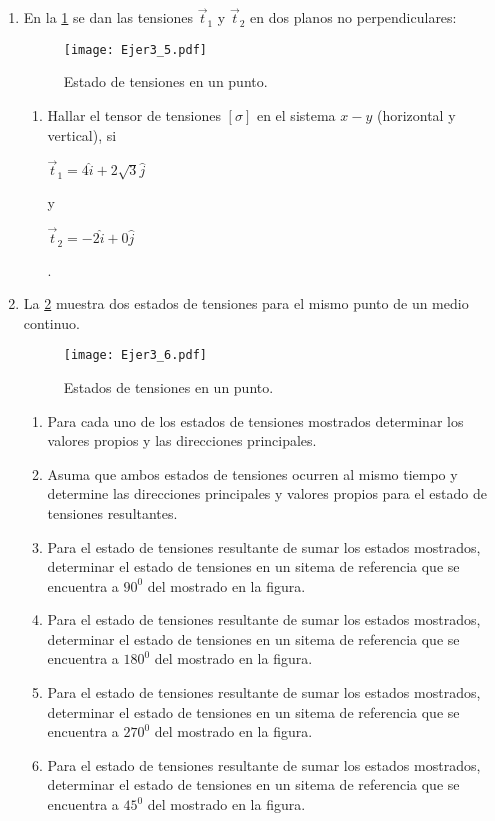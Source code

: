 \documentclass[../notas medios.tex]{subfiles}
\begin{document}
\begin{enumerate}
\item \label{punto05} En la  \cref{cuna:tensiones} se dan las tensiones
$\vec{t}_1$ y $\vec{t}_2$ en dos planos no perpendiculares:\\
%	
\begin{figure}[H]
	\centering
	\texttt{[image: Ejer3\_5.pdf]}
	\caption{Estado de tensiones en un punto.}
	\label{cuna:tensiones}
\end{figure}
\begin{enumerate}
	\item Hallar el tensor de tensiones $[\sigma]$ en el sistema $x-y$ (horizontal y vertical), si \begin{large} $\vec{t}_1= 4 \hat{i} + 2 \sqrt{3} \hat{j}$ \end{large} y  \begin{large} $\vec{t}_2= -2 \hat{i} +0 \hat{j}$ \end{large}.\\
\end{enumerate}
\item \label{punto06} La \cref{direcc} muestra dos estados de tensiones
para el mismo punto de un medio continuo. 
%
\begin{figure}[H]
	\centering
	\texttt{[image: Ejer3\_6.pdf]}
	\caption{Estados de tensiones en un punto.}
	\label{direcc}
\end{figure}
%
\begin{enumerate}
	\item Para cada uno de los estados de tensiones mostrados determinar los
valores propios y las direcciones principales.
	\item Asuma que ambos estados de tensiones ocurren al mismo tiempo y determine
las direcciones principales y valores propios para el estado de tensiones resultantes.
	\item Para el estado de tensiones resultante de sumar los estados mostrados,
determinar el estado de tensiones en un sitema de referencia que se encuentra a $90^0$ del mostrado en la figura.
	\item Para el estado de tensiones resultante de sumar los estados mostrados,
determinar el estado de tensiones en un sitema de referencia que se encuentra a $180^0$ del mostrado en la figura.
	\item Para el estado de tensiones resultante de sumar los estados mostrados,
determinar el estado de tensiones en un sitema de referencia que se encuentra a $270^0$ del mostrado en la figura.
	\item Para el estado de tensiones resultante de sumar los estados mostrados,
determinar el estado de tensiones en un sitema de referencia que se encuentra a $45^0$ del mostrado en la figura.
\end{enumerate}
%


\end{enumerate}
\end{document}
